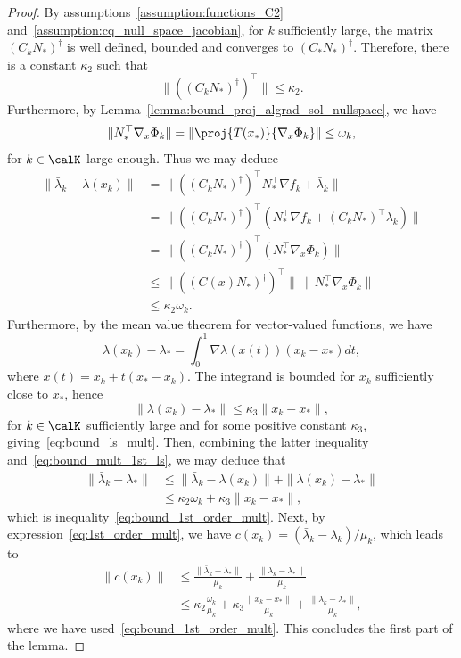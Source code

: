 \begin{proof}
	By assumptions~\ref{assumption:functions_C2} and~\ref{assumption:cq_null_space_jacobian}, for $k$ sufficiently large, the matrix $\left(C_kN_*\right)^\dagger$ is well defined, bounded and converges to $\left(C_*N_*\right)^\dagger$. Therefore, there is a constant $\kappa_2$ such that
	\begin{equation*}
		\|(\left(C_kN_*\right)^\dagger)^\top \| \le \kappa_2.
	\end{equation*}
	Furthermore, by Lemma~\ref{lemma:bound_proj_algrad_sol_nullspace}, we have
	\[ \|N_*^\top \nabla_x\Phi_k\| = \left\| \proj{T(x_*)}{\nabla_x \Phi_k} \right\| \le  \omega_k,\]
	for $k \in \calK$ large enough. Thus we may deduce
	\begin{equation}\label{eq:bound_mult_1st_ls}
		\begin{split}
			\|\bar \lambda_k - \lambda(x_k) \| & = \|(\left(C_kN_*\right)^\dagger)^\top N_*^\top\nabla f_k + \bar\lambda_k\| \\
			& = \|(\left(C_kN_*\right)^\dagger)^\top (N_*^\top\nabla f_k + (C_kN_*)^\top\bar\lambda_k)\| \\
			& = \|((C_kN_*)^\dagger)^\top (N_*^\top  \nabla_x \Phi_k)\| \\
			& \le 	\|(\left(C(x)N_*\right)^\dagger)^\top \| \ \|N_*^\top \nabla_x\Phi_k\| \\
			& \le \kappa_2 \omega_k.
		\end{split}
	\end{equation}
	Furthermore, by the mean value theorem for vector-valued functions, we have
	\[\lambda(x_k) - \lambda_* = \int_{0}^{1} \nabla \lambda(x(t))(x_k-x_*)dt,\]
	where $x(t) = x_k + t(x_*-x_k)$. The integrand is bounded for $x_k$ sufficiently close to $x_*$, hence
	\[\| \lambda(x_k) - \lambda_*\| \le \kappa_3 \|x_k-x_*\|,\]
	for $k\in \calK$ sufficiently large and for some positive constant $\kappa_3$, giving~\eqref{eq:bound_ls_mult}.
	Then, combining the latter inequality and~\eqref{eq:bound_mult_1st_ls}, we may deduce that
	\begin{equation*}
		\begin{split}
			\|\bar \lambda_k - \lambda_* \| & \le \|\bar \lambda_k - \lambda(x_k) \| + \|\lambda(x_k) - \lambda_* \| \\
			& \le \kappa_2 \omega_k + \kappa_3 \|x_k-x_*\|,
		\end{split}
	\end{equation*}
	which is inequality~\eqref{eq:bound_1st_order_mult}. 
	Next, by expression~\eqref{eq:1st_order_mult}, we have $c(x_k) = (\bar \lambda_k - \lambda_k) / \mu_k$, which leads to
	\begin{equation*}
		\begin{split}
			\|c(x_k) \| & \le \frac{\|\bar \lambda_k - \lambda_* \|}{\mu_k} + \frac{\|\lambda_k - \lambda_* \|}{\mu_k} \\
			& \le \kappa_2 \frac{\omega_k}{\mu_k} + \kappa_3 \frac{\|x_k-x_*\|}{\mu_k} + \frac{\|\lambda_k - \lambda_* \|}{\mu_k},
		\end{split}
	\end{equation*}
	where we have used~\eqref{eq:bound_1st_order_mult}.
This concludes the first part of the lemma. 
	

\end{proof}
